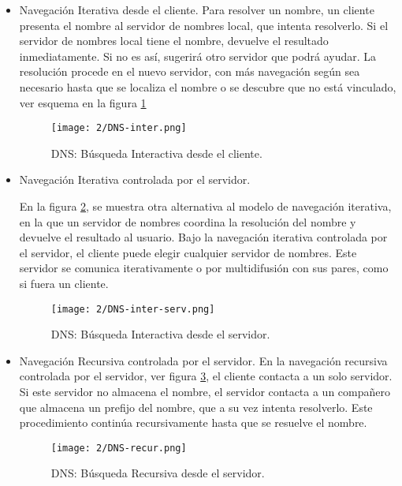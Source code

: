 \begin{itemize}
	\item Navegación Iterativa desde el cliente.
	Para resolver un nombre, un cliente presenta el nombre al servidor de nombres local, que intenta resolverlo. Si el servidor de nombres local tiene el nombre, devuelve el resultado inmediatamente. Si no es así, sugerirá otro servidor que podrá ayudar. La resolución procede en el nuevo servidor, con más navegación según sea necesario hasta que se localiza el nombre o se descubre que no está vinculado, ver esquema en la figura \ref{fig:DNS-inter}
	
	
	\begin{figure}									
		\texttt{[image: 2/DNS-inter.png]}		
		\caption{DNS: Búsqueda Interactiva desde el cliente. }
		\label{fig:DNS-inter} 		
	\end{figure}
	
	\item Navegación Iterativa controlada por el servidor.
	
	En la figura \ref{fig:DNS-inter-serv}, se muestra otra alternativa al modelo de navegación iterativa, en la que un servidor de nombres coordina la resolución del nombre y devuelve el resultado al  usuario.  Bajo la navegación iterativa controlada por el servidor,  el cliente puede elegir cualquier servidor de nombres. Este servidor se comunica iterativamente o por multidifusión con sus pares, como si fuera un cliente.
	\begin{figure}									
		\texttt{[image: 2/DNS-inter-serv.png]}		
		\caption{DNS: Búsqueda Interactiva desde el servidor. }
		\label{fig:DNS-inter-serv} 		
	\end{figure}
		
	\item Navegación Recursiva controlada por el servidor.
	  En la navegación recursiva controlada por el servidor, ver figura \ref{fig:DNS-recur}, el cliente  contacta a un solo servidor. Si este servidor no almacena el nombre, el servidor contacta a un compañero que almacena un prefijo  del nombre, que a su vez intenta resolverlo. Este procedimiento continúa recursivamente hasta que se resuelve el nombre.
	
		\begin{figure}									
		\texttt{[image: 2/DNS-recur.png]}		
		\caption{DNS: Búsqueda Recursiva desde el servidor. }
		\label{fig:DNS-recur} 		
	\end{figure}
\end{itemize}


